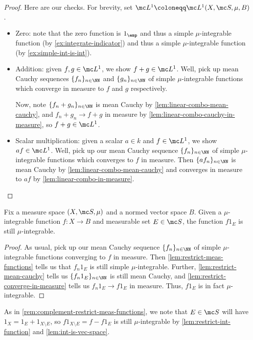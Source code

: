 \documentclass[../notes.tex]{subfiles}
\begin{document}
\begin{proof}
	Here are our checks. For brevity, set $\mc L^1\coloneqq\mc L^1(X,\mc S,\mu,B)$.
	\begin{itemize}
		\item Zero: note that the zero function is $1_\emp$ and thus a simple $\mu$-integrable function (by \autoref{ex:integrate-indicator}) and thus a simple $\mu$-integrable function (by \autoref{ex:simple-int-is-int}).
		\item Addition: given $f,g\in\mc L^1$, we show $f+g\in\mc L^1$. Well, pick up mean Cauchy sequences $\{f_n\}_{n\in\NN}$ and $\{g_n\}_{n\in\NN}$ of simple $\mu$-integrable functions which converge in measure to $f$ and $g$ respectively.
		
		Now, note $\{f_n+g_n\}_{n\in\NN}$ is mean Cauchy by \autoref{lem:linear-combo-mean-cauchy}, and $f_n+g_n\to f+g$ in measure by \autoref{lem:linear-combo-cauchy-in-measure}, so $f+g\in\mc L^1$.
		\item Scalar multiplication: given a scalar $a\in k$ and $f\in\mc L^1$, we show $af\in\mc L^1$. Well, pick up our mean Cauchy sequence $\{f_n\}_{n\in\NN}$ of simple $\mu$-integrable functions which converges to $f$ in measure. Then $\{af_n\}_{n\in\NN}$ is mean Cauchy by \autoref{lem:linear-combo-mean-cauchy} and converges in measure to $af$ by \autoref{lem:linear-combo-in-measure}.
		\qedhere
	\end{itemize}
\end{proof}
\begin{lemma} \label{lem:restrict-int-function}
	Fix a measure space $(X,\mc S,\mu)$ and a normed vector space $B$. Given a $\mu$-integrable function $f\colon X\to B$ and measurable set $E\in\mc S$, the function $f1_E$ is still $\mu$-integrable.
\end{lemma}
\begin{proof}
	As usual, pick up our mean Cauchy sequence $\{f_n\}_{n\in\NN}$ of simple $\mu$-integrable functions converging to $f$ in measure. Then \autoref{lem:restrict-meas-functions} tells us that $f_n1_E$ is still simple $\mu$-integrable. Further, \autoref{lem:restrict-mean-cauchy} tells us $\{f_n1_E\}_{n\in\NN}$ is still mean Cauchy, and \autoref{lem:restrict-converge-in-measure} tells us $f_n1_E\to f1_E$ in measure. Thus, $f1_E$ is in fact $\mu$-integrable.
\end{proof}
\begin{remark} \label{rem:complement-restrict-int}
	As in \autoref{rem:complement-restrict-meas-functions}, we note that $E\in\mc S$ will have $1_X=1_E+1_{X\setminus E}$, so $f1_{X\setminus E}=f-f1_E$ is still $\mu$-integrable by \autoref{lem:restrict-int-function} and \autoref{lem:int-is-vec-space}.
\end{remark}
\end{document}

